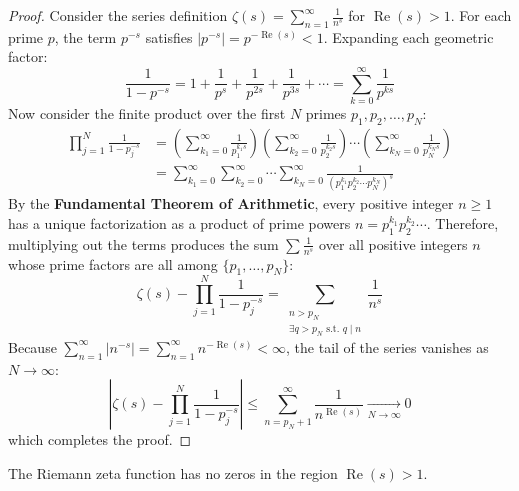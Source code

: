 \documentclass[a4paper]{article}
\begin{document}
\begin{proof}
Consider the series definition $\zeta(s) = \sum_{n=1}^\infty \frac{1}{n^s}$ for $\operatorname{Re}(s) > 1$. For each prime $p$, the term $p^{-s}$ satisfies $|p^{-s}| = p^{-\operatorname{Re}(s)} < 1$. Expanding each geometric factor:
\begin{equation*}
    \frac{1}{1 - p^{-s}} = 1 + \frac{1}{p^s} + \frac{1}{p^{2s}} + \frac{1}{p^{3s}} + \cdots = \sum_{k=0}^{\infty} \frac{1}{p^{ks}}
\end{equation*}
Now consider the finite product over the first $N$ primes $p_1, p_2, \dots, p_N$:
\begin{align*}
    \prod_{j=1}^N \frac{1}{1 - p_j^{-s}} &= \left( \sum_{k_1=0}^\infty \frac{1}{p_1^{k_1 s}} \right) \left( \sum_{k_2=0}^\infty \frac{1}{p_2^{k_2 s}} \right) \cdots \left( \sum_{k_N=0}^\infty \frac{1}{p_N^{k_N s}} \right) \\
    &= \sum_{k_1=0}^\infty \sum_{k_2=0}^\infty \cdots \sum_{k_N=0}^\infty \frac{1}{(p_1^{k_1} p_2^{k_2} \cdots p_N^{k_N})^s}
\end{align*}
By the \textbf{Fundamental Theorem of Arithmetic}, every positive integer $n \ge 1$ has a unique factorization as a product of prime powers $n = p_1^{k_1} p_2^{k_2} \cdots$. Therefore, multiplying out the terms produces the sum $\sum \frac{1}{n^s}$ over all positive integers $n$ whose prime factors are all among $\{p_1, \dots, p_N\}$:
\begin{equation*}
    \zeta(s) - \prod_{j=1}^N \frac{1}{1 - p_j^{-s}} = \sum_{\substack{n > p_N \\ \exists q > p_N \text{ s.t. } q \mid n}} \frac{1}{n^s}
\end{equation*}
Because $\sum_{n=1}^\infty |n^{-s}| = \sum_{n=1}^\infty n^{-\operatorname{Re}(s)} < \infty$, the tail of the series vanishes as $N \to \infty$:
\begin{equation*}
    \left| \zeta(s) - \prod_{j=1}^N \frac{1}{1 - p_j^{-s}} \right| \le \sum_{n = p_N + 1}^{\infty} \frac{1}{n^{\operatorname{Re}(s)}} \xrightarrow[N \to \infty]{} 0
\end{equation*}
which completes the proof.
\end{proof}

\begin{corollary}\label{zf:cor:no-zeros-right}
The Riemann zeta function has no zeros in the region $\operatorname{Re}(s) > 1$.
\end{corollary}
\end{document}
